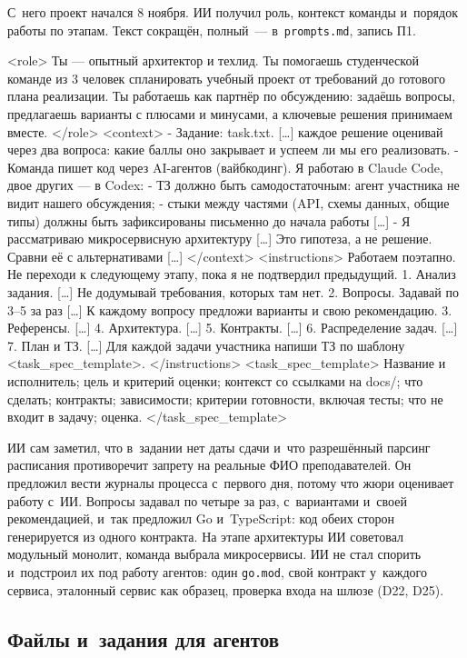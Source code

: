 \documentclass[a4paper,10pt]{article}
\let\oldsubsection\subsection
\renewcommand{\subsection}{\Needspace{10\baselineskip}\oldsubsection}
\newcommand{\code}[1]{\texttt{#1}}
\begin{document}
С~него проект начался 8 ноября. ИИ получил роль, контекст команды и~порядок работы по этапам. Текст сокращён, полный~— в~\code{prompts.md}, запись П1.

\begin{listing}
<role>
Ты — опытный архитектор и техлид. Ты помогаешь студенческой команде из 3 человек спланировать
учебный проект от требований до готового плана реализации. Ты работаешь как партнёр по обсуждению:
задаёшь вопросы, предлагаешь варианты с плюсами и минусами, а ключевые решения принимаем вместе.
</role>
<context>
- Задание: task.txt. […] каждое решение оценивай через два вопроса: какие баллы оно закрывает
  и успеем ли мы его реализовать.
- Команда пишет код через AI-агентов (вайбкодинг). Я работаю в Claude Code, двое других — в Codex:
  - ТЗ должно быть самодостаточным: агент участника не видит нашего обсуждения;
  - стыки между частями (API, схемы данных, общие типы) должны быть зафиксированы письменно
    до начала работы […]
- Я рассматриваю микросервисную архитектуру […] Это гипотеза, а не решение. Сравни её с
  альтернативами […]
</context>
<instructions>
Работаем поэтапно. Не переходи к следующему этапу, пока я не подтвердил предыдущий.
1. Анализ задания. […] Не додумывай требования, которых там нет.
2. Вопросы. Задавай по 3–5 за раз […] К каждому вопросу предложи варианты и свою рекомендацию.
3. Референсы. […] 4. Архитектура. […] 5. Контракты. […] 6. Распределение задач. […]
7. План и ТЗ. […] Для каждой задачи участника напиши ТЗ по шаблону <task_spec_template>.
</instructions>
<task_spec_template>
Название и исполнитель; цель и критерий оценки; контекст со ссылками на docs/; что сделать;
контракты; зависимости; критерии готовности, включая тесты; что не входит в задачу; оценка.
</task_spec_template>
\end{listing}

ИИ сам заметил, что в~задании нет даты сдачи и~что разрешённый парсинг расписания противоречит запрету на реальные ФИО преподавателей. Он предложил вести журналы процесса с~первого дня, потому что жюри оценивает работу с~ИИ. Вопросы задавал по четыре за раз, с~вариантами и~своей рекомендацией, и~так предложил Go и~TypeScript: код обеих сторон генерируется из одного контракта. На этапе архитектуры ИИ советовал модульный монолит, команда выбрала микросервисы. ИИ не стал спорить и~подстроил их под работу агентов: один \code{go.mod}, свой контракт у~каждого сервиса, эталонный сервис как образец, проверка входа на шлюзе (D22, D25).

\subsection{Файлы и~задания для агентов}\label{s3-files}
\end{document}
